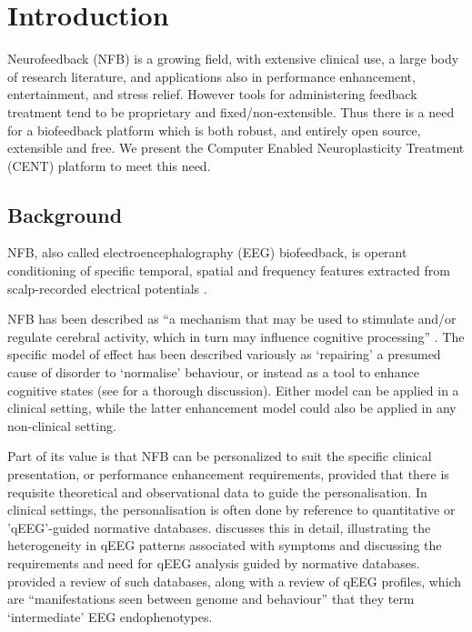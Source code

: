 \documentclass[fleqn,10pt]{wlpeerj}
\begin{document}
\newpage




\section{Introduction}

Neurofeedback (NFB) is a growing field, with extensive clinical use, a large body of research literature, and applications also in performance enhancement, entertainment, and stress relief. However tools for administering feedback treatment tend to be proprietary and fixed/non-extensible. Thus there is a need for a biofeedback platform which is both robust, and entirely open source, extensible and free. We present the Computer Enabled Neuroplasticity Treatment (CENT) platform to meet this need.




\subsection{Background}
NFB, also called electroencephalography (EEG) biofeedback, is operant conditioning of specific temporal, spatial and frequency features extracted from scalp-recorded electrical potentials \citep{Lubar1976}.

NFB has been described as “a mechanism that may be used to stimulate and/or regulate cerebral activity, which in turn may influence cognitive processing” \citep{Vernon2003}. The specific model of effect has been described variously as ‘repairing’ a presumed cause of disorder to ‘normalise’ behaviour, or instead as a tool to enhance cognitive states (see \cite{Gevensleben2014} for a thorough discussion). Either model can be applied in a clinical setting, while the latter enhancement model could also be applied in any non-clinical setting.


Part of its value is that NFB can be personalized to suit the specific clinical presentation, or performance enhancement requirements, provided that there is requisite theoretical and observational data to guide the personalisation. In clinical settings, the personalisation is often done by reference to quantitative or 'qEEG'-guided normative databases. \cite{Hammond2010} discusses this in detail, illustrating the heterogeneity in qEEG patterns associated with symptoms and discussing the requirements and need for qEEG analysis guided by normative databases. \cite{Johnstone2005} provided a review of such databases, along with a review of qEEG profiles, which are “manifestations seen between genome and behaviour” that they term ‘intermediate’ EEG endophenotypes.
\end{document}
